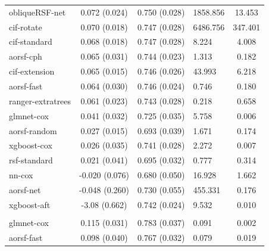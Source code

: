 \documentclass[twoside,11pt]{article}\usepackage[]{graphicx}\usepackage[]{xcolor}
\newenvironment{knitrout}{}{} %
\begin{document}
\begin{knitrout}
\begin{longtable}[t]{lcclc}
\hline
\hspace{1em}obliqueRSF-net & 0.072 (0.024) & 0.750 (0.028) & 1858.856 & 13.453\\
\hspace{1em}cif-rotate & 0.070 (0.018) & 0.747 (0.028) & 6486.756 & 347.401\\
\hspace{1em}cif-standard & 0.068 (0.018) & 0.747 (0.028) & 8.224 & 4.008\\
\hspace{1em}aorsf-cph & 0.065 (0.031) & 0.744 (0.023) & 1.313 & 0.182\\
\hspace{1em}cif-extension & 0.065 (0.015) & 0.746 (0.026) & 43.993 & 6.218\\
\hspace{1em}aorsf-fast & 0.064 (0.030) & 0.746 (0.024) & 0.746 & 0.180\\
\hspace{1em}ranger-extratrees & 0.061 (0.023) & 0.743 (0.028) & 0.218 & 0.658\\
\hspace{1em}glmnet-cox & 0.041 (0.032) & 0.725 (0.035) & 5.758 & 0.006\\
\hspace{1em}aorsf-random & 0.027 (0.015) & 0.693 (0.039) & 1.671 & 0.174\\
\hspace{1em}xgboost-cox & 0.026 (0.035) & 0.741 (0.028) & 2.272 & 0.007\\
\hspace{1em}rsf-standard & 0.021 (0.041) & 0.695 (0.032) & 0.777 & 0.314\\
\hspace{1em}nn-cox & -0.020 (0.076) & 0.680 (0.050) & 16.928 & 1.662\\
\hspace{1em}aorsf-net & -0.048 (0.260) & 0.730 (0.055) & 455.331 & 0.176\\
\hspace{1em}xgboost-aft & -3.08 (0.662) & 0.742 (0.024) & 9.532 & 0.010\\
\addlinespace[0.3em]
\hline
\multicolumn{5}{l}{\textit{\textbf{FCL; death, n = 541, p = 7}}}\\
\hline
\hspace{1em}glmnet-cox & 0.115 (0.031) & 0.783 (0.037) & 0.091 & 0.002\\
\hspace{1em}aorsf-fast & 0.098 (0.040) & 0.767 (0.032) & 0.079 & 0.019\\

\end{longtable}
\end{knitrout}
\end{document}
